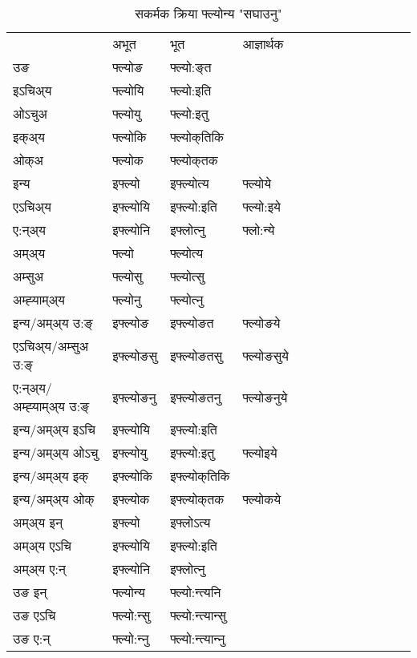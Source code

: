 \begin{table}[H]
\centering
\caption{\label{o.vt} सकर्मक क्रिया  फ्ल्योन्य  "सघाउनु"  }
\begin{tabular}{l|l|l|l|l|l|l|l|l|l|l|l|l}  \toprule
&अभूत & भूत & आज्ञार्थक \\ 
उङ &फ्ल्योङ &फ्ल्यो:ङ्‌त \\ 
इऽचिअ्य &फ्ल्योयि &फ्ल्यो:इति   \\ 
ओऽचुअ &फ्ल्योयु &फ्ल्यो:इतु   \\ 
इक्अ्य &फ्ल्योकि &फ्ल्योक्‌तिकि   \\ 
ओक्अ &फ्ल्योक &फ्ल्योक्‌तक   \\ 
इन्य & इफ्ल्यो & इफ्ल्योत्य &फ्ल्योये  \\ 
एऽचिअ्य & इफ्ल्योयि & इफ्ल्यो:इति &फ्ल्यो:इये    \\ 
ए:न्अ्य & इफ्ल्योनि  & इफ्लोत्‍नु &फ्लो:न्ये  \\ 
अम्अ्य & फ्ल्यो & फ्ल्योत्य   \\ 
अम्सुअ & फ्ल्योसु & फ्ल्योत्सु     \\ 
अम्ह्‍याम्अ्य & फ्ल्योनु  & फ्ल्योत्‍नु \\ 
\midrule
इन्य/अम्अ्य उ:ङ्‌&इफ्ल्योङ &इफ्ल्योङत &फ्ल्योङये \\ 
एऽचिअ्य/अम्सुअ उ:ङ्‌ &इफ्ल्योङसु &इफ्ल्योङतसु &फ्ल्योङसुये \\ 
ए:न्अ्य/अम्ह्‍याम्अ्य उ:ङ्‌ &इफ्ल्योङनु &इफ्ल्योङतनु &फ्ल्योङनुये \\ 
इन्य/अम्अ्य इऽचि &इफ्ल्योयि &इफ्ल्यो:इति    \\ 
इन्य/अम्अ्य ओऽचु &इफ्ल्योयु &इफ्ल्यो:इतु  &फ्ल्योइये  \\ 
इन्य/अम्अ्य इक् &इफ्ल्योकि &इफ्ल्योक्‌तिकि   \\ 
इन्य/अम्अ्य ओक् &इफ्ल्योक &इफ्ल्योक्‌तक  &फ्ल्योकये  \\ 
अम्अ्य इन् & इफ्ल्यो & इफ्लोऽत्य   \\ 
अम्अ्य एऽचि & इफ्ल्योयि & इफ्ल्यो:इति     \\ 
अम्अ्य ए:न् & इफ्ल्योनि  & इफ्लोत्‍नु  \\ 
\midrule
उङ इन् & फ्ल्योन्य  & फ्ल्यो:न्त्यनि  \\ 
उङ एऽचि & फ्ल्यो:न्सु  & फ्ल्यो:न्त्यान्सु   \\ 
उङ ए:न्& फ्ल्यो:न्‍नु  & फ्ल्यो:न्त्यान्‍नु   \\ 
\bottomrule
\end{tabular}
\end{table}


